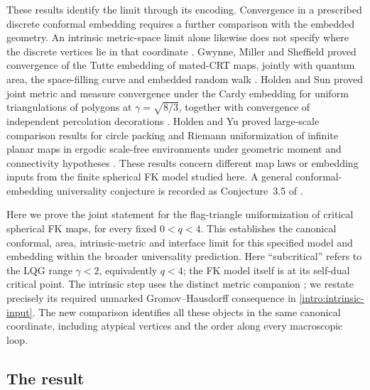 \documentclass[11pt]{article}
\numberwithin{equation}{section}
\theoremstyle{definition}
\theoremstyle{remark}
\newcommand{\1}{\mathbf 1}
\begin{document}
These results identify the limit through its encoding. Convergence
in a prescribed discrete conformal embedding requires a further
comparison with the embedded geometry. An intrinsic metric-space
limit alone likewise does not specify where the discrete vertices
lie in that coordinate \citep{MillerSheffieldSphere,GHS-survey}.
Gwynne, Miller and Sheffield proved convergence of the Tutte embedding
of mated-CRT maps, jointly with quantum area, the space-filling curve
and embedded random walk
\citep[Theorem~1.1]{GwynneMillerSheffieldTutte}. Holden and Sun proved
joint metric and measure convergence under the Cardy embedding for
uniform triangulations of polygons at $\gamma=\sqrt{8/3}$, together
with convergence of independent percolation decorations
\citep[Theorems~1.3 and~1.6]{HS-Cardy}. Holden and Yu proved large-scale
comparison results for circle packing and Riemann uniformization of
infinite planar maps in ergodic scale-free environments under geometric
moment and connectivity hypotheses
\citep[Theorems~1.6--1.9]{HoldenYuUniformization}. These results concern
different map laws or embedding inputs from the finite spherical FK
model studied here. A general conformal-embedding universality
conjecture is recorded as Conjecture~3.5 of \citet{HS-survey}.

Here we prove the joint statement for the flag-triangle uniformization of
critical spherical FK maps, for every fixed $0<q<4$. This establishes the
canonical conformal, area, intrinsic-metric and interface limit for this
specified model and embedding within the broader universality prediction.
Here ``subcritical'' refers to the LQG range $\gamma<2$, equivalently
$q<4$; the FK model itself is at its self-dual critical point.
The intrinsic step uses the distinct metric companion
\citep[Theorem~1.1]{Intrinsic-input}; we restate precisely its required
unmarked Gromov--Hausdorff consequence in \cref{intro:intrinsic-input}.
The new comparison identifies all these objects in the same canonical
coordinate, including atypical vertices and the order along every
macroscopic loop.

\subsection{The result}
\end{document}
